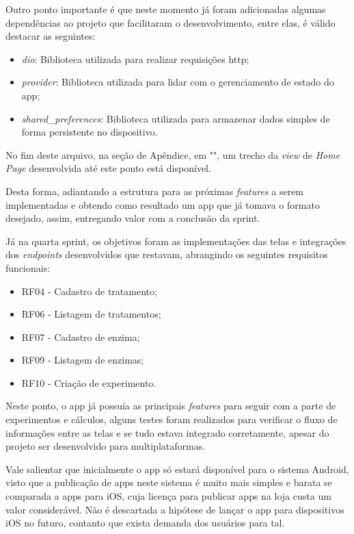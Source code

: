Outro ponto importante é que neste momento já foram adicionadas algumas dependências ao projeto que facilitaram o desenvolvimento, entre elas, é válido destacar as seguintes:
\begin{itemize}
   \item \textit{dio}: Biblioteca utilizada para realizar requisições \ac{http};
   \item \textit{provider}: Biblioteca utilizada para lidar com o gerenciamento de estado do \ac{app};
   \item \textit{shared\_preferences}: Biblioteca utilizada para armazenar dados simples de forma persistente no dispositivo.
 \end{itemize}

No fim deste arquivo, na seção de Apêndice, em "", um trecho da \textit{view} de \textit{Home Page} desenvolvida até este ponto está disponível.

Desta forma, adiantando a estrutura para as próximas \textit{features} a serem implementadas e obtendo como resultado um \ac{app} que já tomava o formato desejado, assim, entregando valor com a conclusão da sprint.

Já na quarta sprint, os objetivos foram as implementações das telas e integrações dos \textit{endpoints} desenvolvidos que restavam, abrangindo os seguintes requisitos funcionais:
\begin{itemize}
   \item RF04 - Cadastro de tratamento;
   \item RF06 - Listagem de tratamentos;
   \item RF07 - Cadastro de enzima;
   \item RF09 - Listagem de enzimas;
   \item RF10 - Criação de experimento.
 \end{itemize}

 Neste ponto, o \ac{app} já possuía as principais \textit{features} para seguir com a parte de experimentos e cálculos, alguns testes foram realizados para verificar o fluxo de informações entre as telas e se tudo estava integrado corretamente, apesar do projeto ser desenvolvido para multiplataformas.
 
 Vale salientar que inicialmente o \ac{app} só estará disponível para o sistema Android, visto que a publicação de \acp{app} neste sistema é muito mais simples e barata se comparada a \acp{app} para iOS, cuja licença para publicar \acp{app} na loja custa um valor considerável. Não é descartada a hipótese de lançar o \ac{app} para dispositivos iOS no futuro, contanto que exista demanda dos usuários para tal.

